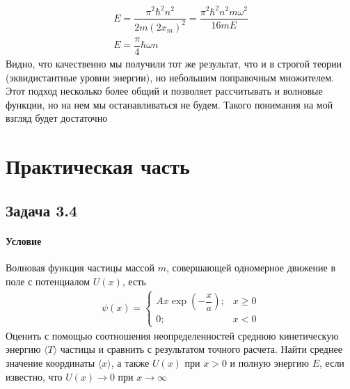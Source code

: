 \documentclass[12pt]{article}
\begin{document}
\begin{gather*}
    E = \dfrac{\pi^2\hbar^2n^2}{2m(2x_m)^2 } = \dfrac{\pi^2\hbar^2n^2 m\omega^2}{16mE  } \\
    E = \dfrac{\pi}{4}\hbar\omega n
\end{gather*}
Видно, что качественно мы получили тот же результат, что и в строгой теории (эквидистантные уровни энергии), но небольшим поправочным множителем. Этот подход несколько более общий и позволяет рассчитывать и волновые функции, но на нем мы останавливаться не будем. Такого понимания на мой взгляд будет достаточно



\section{Практическая часть}
\subsection{Задача 3.4}
\label{task_3.4}
\paragraph{Условие}
Волновая функция частицы массой $m$, совершающей одномерное движение в поле с потенциалом $U(x)$, есть 
\begin{gather*}
\psi(x) = 
    \begin{cases}
        Ax\exp{\left( -\dfrac{x}{a}\right)}; &x \ge 0\\
        0; &x<0
    \end{cases}
\end{gather*}
Оценить с помощью соотношения неопределенностей среднюю кинетическую энергию $\langle T \rangle$ частицы и сравнить с результатом точного расчета. Найти среднее значение координаты $\langle x \rangle$, а также $U(x)$ при $x>0$ и полную энергию $E$, если известно, что $U(x) \rightarrow 0$ при $x \rightarrow \infty$
\end{document}
